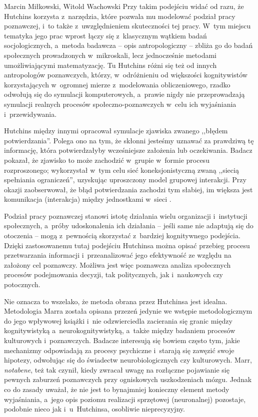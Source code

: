 \begin{artplenv2auth}{Marcin Miłkowski, Witold Wachowski}
Przy takim podejściu widać od razu, że Hutchins korzysta z~narzędzia, które pozwala mu modelować podział pracy poznawczej, i~to także z~uwzględnieniem skuteczności tej pracy. W~tym miejscu tematyka jego prac wprost łączy się z~klasycznym wątkiem badań socjologicznych, a~metoda badawcza -- opis antropologiczny -- zbliża go do badań społecznych prowadzonych w~mikroskali, lecz jednocześnie metodami umożliwiającymi matematyzację. Tu Hutchins różni się też od innych antropologów poznawczych, którzy, w~odróżnieniu od większości kognitywistów korzystających w~ogromnej mierze z~modelowania obliczeniowego, rzadko odwołują się do symulacji komputerowych, a~prawie nigdy nie przeprowadzają symulacji realnych procesów społeczno-poznawczych w~celu ich wyjaśniania i~przewidywania.

Hutchins między innymi opracował symulacje zjawiska zwanego ,,błędem potwierdzania''. Polega ono na tym, że skłonni jesteśmy uznawać za prawdziwą tę informację, która potwierdzałyby wcześniejsze założenia lub oczekiwania. Badacz pokazał, że zjawisko to może zachodzić w~grupie w~formie procesu rozproszonego; wykorzystał w~tym celu sieć koneksjonistyczną zwaną ,,siecią spełniania ograniczeń'', uzyskując uproszczony model grupowej interakcji. Przy okazji zaobserwował, że błąd potwierdzania zachodzi tym słabiej, im większa jest komunikacja (interakcja) między jednostkami w~sieci
\parencite[][s.~239–255]{hutchins_cognition_1995}.%


Podział pracy poznawczej stanowi istotę działania wielu organizacji i~instytucji społecznych, a~próby udoskonalenia ich działania -- jeśli same nie adaptują się do otoczenia -- mogą z~pewnością skorzystać z~bardziej kognitywnego podejścia. Dzięki zastosowanemu tutaj podejściu Hutchinsa można opisać przebieg procesu przetwarzania informacji i~przeanalizować jego efektywność ze względu na założony cel poznawczy. Możliwa jest więc poznawcza analiza społecznych procesów podejmowania decyzji, tak politycznych, jak i~naukowych czy potocznych.

Nie oznacza to wszelako, że metoda obrana przez Hutchinsa jest idealna. Metodologia Marra została opisana przezeń jedynie we wstępie metodologicznym do jego wpływowej książki i~nie odzwierciedla zacierania się granic między kognitywistyką a~neurokognitywistyką, a~także między badaniem procesów kulturowych i~poznawczych. Badacze interesują się bowiem często tym, jakie mechanizmy odpowiadają za procesy psychiczne i~starają się zawęzić swoje hipotezy, odwołując się do świadectw neurobiologicznych czy kulturowych. Marr, \textit{notabene}, też tak czynił, kiedy zwracał uwagę na rozłączne pojawianie się pewnych zaburzeń poznawczych przy ogniskowych uszkodzeniach mózgu. Jednak co do zasady uważał, że nie jest to bynajmniej konieczny element metody wyjaśniania, a~jego opis poziomu realizacji sprzętowej (neuronalnej) pozostaje, podobnie nieco jak i~u~Hutchinsa, osobliwie nieprecyzyjny.


\end{artplenv2auth}
